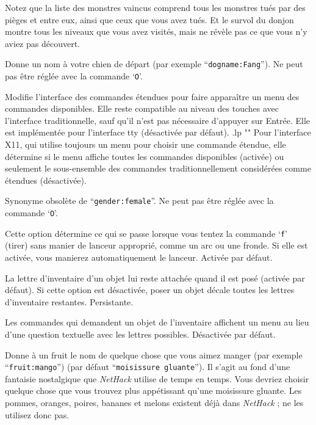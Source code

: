 \documentclass[titlepage]{article}
\begin{document}
\begin{description}[font=\mdseries\itshape]
Notez que la liste des monstres vaincus comprend tous les monstres tués par
des pièges et entre eux, ainsi que ceux que vous avez tués.
Et le survol du donjon montre tous les niveaux que vous avez visités, mais ne
révèle pas ce que vous n'y aviez pas découvert.
\item[dogname]
Donne un nom à votre chien de départ (par exemple ``\texttt{dogname:Fang}'').
Ne peut pas être réglée avec la commande `\texttt{O}'.
\item[extmenu]
Modifie l'interface des commandes étendues pour faire apparaître un menu des commandes disponibles.
Elle reste compatible au niveau des touches avec l'interface traditionnelle, sauf qu'il n'est
pas nécessaire d'appuyer sur Entrée.
Elle est implémentée pour l'interface tty (désactivée par défaut).
.lp ""
Pour l'interface X11, qui utilise toujours un menu pour choisir une commande
étendue, elle détermine si le menu affiche toutes les commandes disponibles (activée)
ou seulement le sous-ensemble des commandes traditionnellement considérées comme
étendues (désactivée).
\item[female]
Synonyme obsolète de ``\texttt{gender:female}''. Ne peut pas être réglée avec la
commande `\texttt{O}'.
\item[fireassist]
Cette option détermine ce qui se passe lorsque vous tentez la commande `\texttt{f}' (tirer)
sans manier de lanceur approprié, comme un arc ou une fronde.
Si elle est activée, vous manierez automatiquement le lanceur. Activée par défaut.
\item[fixinv]
La lettre d'inventaire d'un objet lui reste attachée quand il est posé (activée par défaut).
Si cette option est désactivée, poser un objet décale toutes les lettres d'inventaire restantes.
Persistante.
\item[force\textunderscore invmenu]
Les commandes qui demandent un objet de l'inventaire affichent un menu au lieu
d'une question textuelle avec les lettres possibles. Désactivée par défaut.
\item[fruit]
Donne à un fruit le nom de quelque chose que vous aimez manger (par exemple ``\texttt{fruit:mango}'')
(par défaut ``\texttt{moisissure gluante}''). Il s'agit au fond d'une fantaisie nostalgique que
\textit{NetHack} utilise de temps en temps. Vous devriez choisir quelque chose que vous
trouvez plus appétissant qu'une moisissure gluante. Les pommes, oranges, poires, bananes et
melons existent déjà dans \textit{NetHack} ; ne les utilisez donc pas.
\item[gender]

\end{description}
\end{document}
